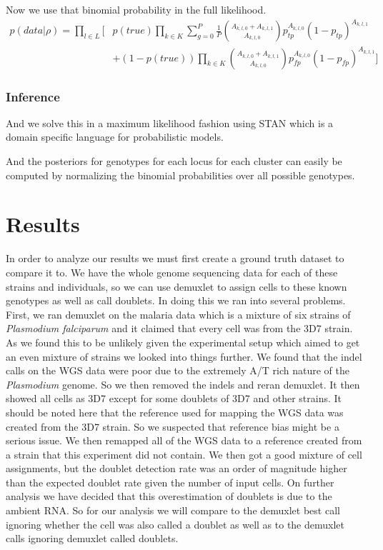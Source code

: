 Now we use that binomial probability in the full likelihood.
\begin{equation}
\begin{split}
p(data | \rho) = \prod_{l \in L} \bigg[ & p(true) \prod_{k \in K} \sum_{g = 0}^P \frac{1}{P} \binom{A_{k,l,0} + A_{k,l,1}}{A_{k,l,0}} p_{tp}^{A_{k,l,0}} (1-p_{tp})^{A_{k,l,1}} \\
 & + (1-p(true))\prod_{k \in K}\binom{A_{k,l,0} + A_{k,l,1}}{A_{k,l,0}}p_{fp}^{A_{k,l,0}} (1-p_{fp})^{A_{k,l,1}}  \bigg]
\end{split}
\end{equation}

\subsubsection{Inference}
And we solve this in a maximum likelihood fashion using STAN which is a domain specific language for probabilistic models.

And the posteriors for genotypes for each locus for each cluster can easily be computed by normalizing the binomial probabilities over all possible genotypes.


\section{Results}
In order to analyze our results we must first create a ground truth dataset to compare it to. We have the whole genome sequencing data for each 
of these strains and individuals, so we can use demuxlet \cite{demuxlet} to assign cells to these known genotypes as well as call doublets. In doing this 
we ran into several problems. First, we ran demuxlet on the malaria data which is a mixture of six strains of \textit{Plasmodium falciparum} and it claimed 
that every cell was from the 3D7 strain. As we found this to be unlikely given the experimental setup which aimed to get an even mixture of strains we looked into 
things further. We found that the indel calls on the WGS data were poor due to the extremely A/T rich nature of the \textit{Plasmodium} genome. So 
we then removed the indels and reran demuxlet. It then showed all cells as 3D7 except for some doublets of 3D7 and other strains. It should be noted here 
that the reference used for mapping the WGS data was created from the 3D7 strain. So we suspected that reference bias might be a serious issue. We then remapped all 
of the WGS data to a reference created from a strain that this experiment did not contain. We then got a good mixture of cell assignments, but the doublet detection rate 
was an order of magnitude higher than the expected doublet rate given the number of input cells. On further analysis we have decided that this overestimation of 
doublets is due to the ambient RNA. So for our analysis we will compare to the demuxlet best call ignoring whether the cell was also called a doublet as well as to the demuxlet 
calls ignoring demuxlet called doublets.

